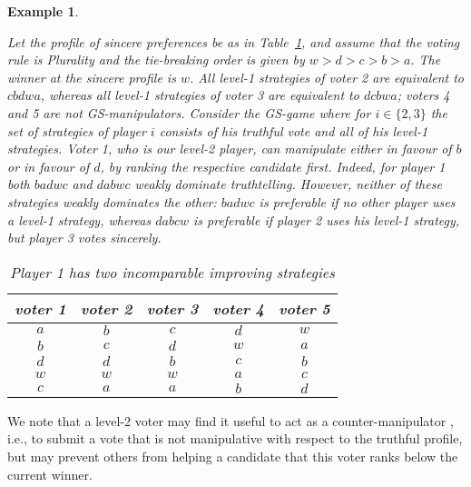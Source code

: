 \documentclass[11pt]{article}
\newtheorem{example}{Example}
\begin{document}
\begin{example}\label{ex:lowerranked}
{\em
Let the profile of sincere preferences be as in Table~\ref{table:example}, and assume that 
the voting rule is Plurality and the tie-breaking order is given by $w>d>c>b>a$. 
The winner at the sincere profile is $w$. All level-1 strategies of voter 2 are equivalent to
$cbdwa$, whereas all level-1 strategies of voter 3 are equivalent to
$dcbwa$; voters 4 and 5 are not GS-manipulators.
Consider the GS-game where for $i\in\{2, 3\}$
the set of strategies of player $i$ consists of his truthful vote and all of his level-1 strategies.
Voter 1, who is our level-2 player, 
can manipulate either in favour of $b$ or in favour of $d$, by ranking the respective candidate first. 
Indeed, for player 1 both $badwc$ and $dabwc$ weakly dominate truthtelling.
However, neither of these strategies weakly dominates the other:
$badwc$ is preferable if no other player uses a level-1 strategy, whereas $dabcw$
is preferable if player 2 uses his level-1 strategy, but player 3 votes sincerely.

\begin{table}[h]
\begin{center}
\begin{tabular}{c|c|c|c|c}
voter 1&voter 2&voter 3&voter 4&voter 5\\
\midrule
$a$&$b$&$c$&$d$&$w$\\
$b$&$c$&$d$&$w$&$a$\\
$d$&$d$&$b$&$c$&$b$\\
$w$&$w$&$w$&$a$&$c$\\
$c$&$a$&$a$&$b$&$d$\\
\end{tabular}
\caption{Player 1 has two incomparable improving strategies
}\label{table:example}
\end{center}
\end{table}
}
\end{example}

We note that a level-2 voter may find it useful to act as a counter-manipulator
\citep{pattanaik1976threats}, i.e., 
to submit a vote that is not manipulative with respect to the truthful
profile, but may prevent others from helping a candidate that this voter ranks
below the current winner.
\end{document}
